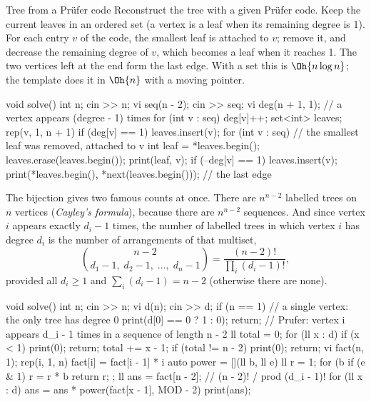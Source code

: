 \begin{problem}{Tree from a Prüfer code}
Reconstruct the tree with a given Prüfer code.
\solution Keep the current leaves in an ordered set (a vertex is a leaf when its remaining degree is 1). For each entry $v$ of
the code, the smallest leaf is attached to $v$; remove it, and decrease the remaining degree of $v$, which becomes a leaf when
it reaches 1. The two vertices left at the end form the last edge. With a set this is $\Oh{n \log n}$; the template does it in
$\Oh{n}$ with a moving pointer.
\end{problem}

\begin{code}
void solve() {
    int n;
    cin >> n;
    vi seq(n - 2);
    cin >> seq;
    vi deg(n + 1, 1);  // a vertex appears (degree - 1) times
    for (int v : seq) deg[v]++;
    set<int> leaves;
    rep(v, 1, n + 1) if (deg[v] == 1) leaves.insert(v);
    for (int v : seq) {  // the smallest leaf was removed, attached to v
        int leaf = *leaves.begin();
        leaves.erase(leaves.begin());
        print(leaf, v);
        if (--deg[v] == 1) leaves.insert(v);
    }
    print(*leaves.begin(), *next(leaves.begin()));  // the last edge
}
\end{code}


The bijection gives two famous counts at once. There are $n^{n-2}$ labelled trees on $n$ vertices (\emph{Cayley's formula}),
because there are $n^{n-2}$ sequences. And since vertex $i$ appears exactly $d_i - 1$ times, the number of labelled trees in which
vertex $i$ has degree $d_i$ is the number of arrangements of that multiset,
\[
  \binom{n - 2}{d_1 - 1, \; d_2 - 1, \; \ldots, \; d_n - 1} = \frac{(n - 2)!}{\prod_i (d_i - 1)!} ,
\]
provided all $d_i \ge 1$ and $\sum_i (d_i - 1) = n - 2$ (otherwise there are none).

\begin{code}
void solve() {
    int n;
    cin >> n;
    vi d(n);
    cin >> d;
    if (n == 1) {  // a single vertex: the only tree has degree 0
        print(d[0] == 0 ? 1 : 0);
        return;
    }
    // Prufer: vertex i appears d_i - 1 times in a sequence of length n - 2
    ll total = 0;
    for (ll x : d) {
        if (x < 1) {
            print(0);
            return;
        }
        total += x - 1;
    }
    if (total != n - 2) {
        print(0);
        return;
    }
    vi fact(n, 1);
    rep(i, 1, n) fact[i] = fact[i - 1] * i %
    auto power = [](ll b, ll e) {
        ll r = 1;
        for (b %
            if (e & 1) r = r * b %
        return r;
    };
    ll ans = fact[n - 2];  // (n - 2)! / prod (d_i - 1)!
    for (ll x : d) ans = ans * power(fact[x - 1], MOD - 2) %
    print(ans);
}
\end{code}

